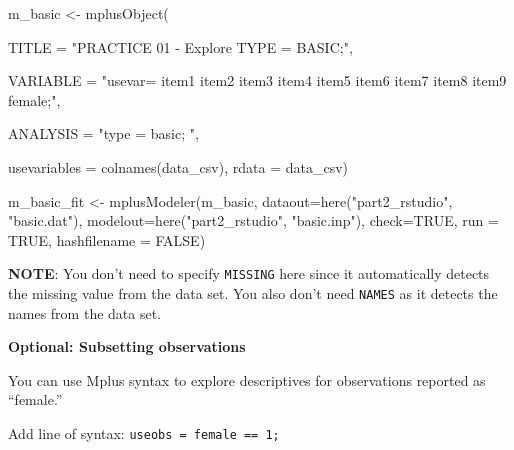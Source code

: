 \documentclass[
]{article}
\newenvironment{Shaded}{\begin{snugshade}}{\end{snugshade}}
\newcommand{\AttributeTok}[1]{\textcolor[rgb]{0.77,0.63,0.00}{#1}}
\newcommand{\ConstantTok}[1]{\textcolor[rgb]{0.00,0.00,0.00}{#1}}
\newcommand{\FunctionTok}[1]{\textcolor[rgb]{0.00,0.00,0.00}{#1}}
\newcommand{\NormalTok}[1]{#1}
\newcommand{\OtherTok}[1]{\textcolor[rgb]{0.56,0.35,0.01}{#1}}
\newcommand{\StringTok}[1]{\textcolor[rgb]{0.31,0.60,0.02}{#1}}
\begin{document}
\begin{Shaded}
\begin{Highlighting}[]
\NormalTok{m\_basic  }\OtherTok{\textless{}{-}} \FunctionTok{mplusObject}\NormalTok{(}
  
  \AttributeTok{TITLE =} \StringTok{"PRACTICE 01 {-} Explore TYPE = BASIC;"}\NormalTok{,}
  
  \AttributeTok{VARIABLE =} 
 \StringTok{"usevar= item1 item2 item3 item4 item5 item6 item7 item8 item9 female;"}\NormalTok{,}
  
  \AttributeTok{ANALYSIS =} 
 \StringTok{"type = basic; "}\NormalTok{,}
 
  \AttributeTok{usevariables =} \FunctionTok{colnames}\NormalTok{(data\_csv), }
  \AttributeTok{rdata =}\NormalTok{ data\_csv)}

\NormalTok{m\_basic\_fit }\OtherTok{\textless{}{-}} \FunctionTok{mplusModeler}\NormalTok{(m\_basic, }
               \AttributeTok{dataout=}\FunctionTok{here}\NormalTok{(}\StringTok{"part2\_rstudio"}\NormalTok{, }\StringTok{"basic.dat"}\NormalTok{),}
               \AttributeTok{modelout=}\FunctionTok{here}\NormalTok{(}\StringTok{"part2\_rstudio"}\NormalTok{, }\StringTok{"basic.inp"}\NormalTok{),}
               \AttributeTok{check=}\ConstantTok{TRUE}\NormalTok{, }\AttributeTok{run =} \ConstantTok{TRUE}\NormalTok{, }\AttributeTok{hashfilename =} \ConstantTok{FALSE}\NormalTok{)}
\end{Highlighting}
\end{Shaded}

\textbf{NOTE}: You don't need to specify \texttt{MISSING} here since it
automatically detects the missing value from the data set. You also
don't need \texttt{NAMES} as it detects the names from the data set.

\textbf{Optional: Subsetting observations}

You can use Mplus syntax to explore descriptives for observations
reported as ``female.''

Add line of syntax: \texttt{useobs\ =\ female\ ==\ 1;}
\end{document}
